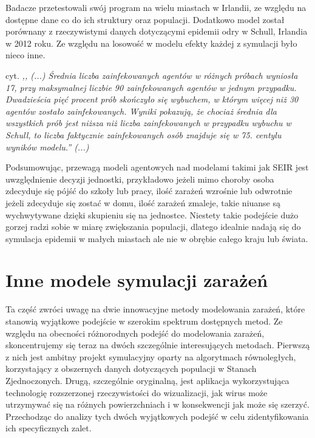 Badacze przetestowali swój program na wielu miastach w Irlandii, ze względu na dostępne dane co do ich struktury oraz populacji.
Dodatkowo model został porównany z rzeczywistymi danych dotyczącymi epidemii odry w Schull, Irlandia w 2012 roku. Ze względu na losowość w modelu efekty każdej z symulacji było nieco inne. 

cyt. \textit{,, (...) Średnia liczba zainfekowanych agentów w różnych próbach wyniosła 17, przy maksymalnej liczbie 90 zainfekowanych agentów w jednym przypadku. Dwadzieścia pięć procent prób skończyło się wybuchem, w którym więcej niż 30 agentów zostało zainfekowanych. Wyniki pokazują, że chociaż średnia dla wszystkich prób jest niższa niż liczba zainfekowanych w przypadku wybuchu w Schull, to liczba faktycznie zainfekowanych osób znajduje się w 75. centylu wyników modelu.'' (...)}\cite{bib:artykul1}

Podsumowując, przewagą modeli agentowych nad modelami takimi jak SEIR jest uwzględnienie decyzji jednostki, przykładowo jeżeli mimo choroby osoba zdecyduje się pójść do szkoły lub pracy, ilość zarażeń wzrośnie lub odwrotnie jeżeli zdecyduje się zostać w domu, ilość zarażeń zmaleje, takie niuanse są wychwytywane dzięki skupieniu się na jednostce. Niestety takie podejście dużo gorzej radzi sobie w miarę zwiększania populacji, dlatego idealnie nadają się do symulacja epidemii w małych miastach ale nie w obrębie całego kraju lub świata.

\section{\textbf{Inne modele symulacji zarażeń}}

Ta część zwróci uwagę na dwie innowacyjne metody modelowania zarażeń, które stanowią wyjątkowe podejście w szerokim spektrum dostępnych metod. Ze względu na obecności różnorodnych podejść do modelowania zarażeń, skoncentrujemy się teraz na dwóch szczególnie interesujących metodach. Pierwszą z nich jest ambitny projekt symulacyjny oparty na algorytmach równoległych, korzystający z obszernych danych dotyczących populacji w Stanach Zjednoczonych. Drugą, szczególnie oryginalną, jest aplikacja wykorzystująca technologię rozszerzonej rzeczywistości do wizualizacji, jak wirus może utrzymywać się na różnych powierzchniach i w konsekwencji jak może się szerzyć. Przechodząc do analizy tych dwóch wyjątkowych podejść w celu zidentyfikowania ich specyficznych zalet.

